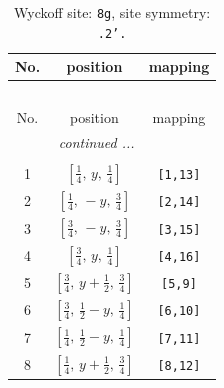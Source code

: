 \documentclass[fleqn,8pt]{jsarticle}
\begin{document}
\renewcommand{\arraystretch}{1.2}
\begin{longtable}{ccc}
\caption{Wyckoff site: {\tt 8g}, site symmetry: {\tt .2'.}}
 \\
 \hline \hline
No. & position & mapping \\ \hline \endfirsthead

\multicolumn{2}{l}{\tablename\ \thetable{}} \\
 \hline \hline
No. & position & mapping \\ \hline \endhead

 \hline \hline
\multicolumn{2}{r}{\footnotesize\it continued ...} \\ \endfoot

 \hline \hline
\multicolumn{2}{r}{} \\ \endlastfoot

1 & $\left[ \frac{1}{4},\, y,\, \frac{1}{4} \right]$ & {\tt [1,13]} \\ \hline
2 & $\left[ \frac{1}{4},\, - y,\, \frac{3}{4} \right]$ & {\tt [2,14]} \\ \hline
3 & $\left[ \frac{3}{4},\, - y,\, \frac{3}{4} \right]$ & {\tt [3,15]} \\ \hline
4 & $\left[ \frac{3}{4},\, y,\, \frac{1}{4} \right]$ & {\tt [4,16]} \\ \hline
5 & $\left[ \frac{3}{4},\, y + \frac{1}{2},\, \frac{3}{4} \right]$ & {\tt [5,9]} \\ \hline
6 & $\left[ \frac{3}{4},\, \frac{1}{2} - y,\, \frac{1}{4} \right]$ & {\tt [6,10]} \\ \hline
7 & $\left[ \frac{1}{4},\, \frac{1}{2} - y,\, \frac{1}{4} \right]$ & {\tt [7,11]} \\ \hline
8 & $\left[ \frac{1}{4},\, y + \frac{1}{2},\, \frac{3}{4} \right]$ & {\tt [8,12]} \\
\end{longtable}
\renewcommand{\arraystretch}{1.2}
\end{document}

